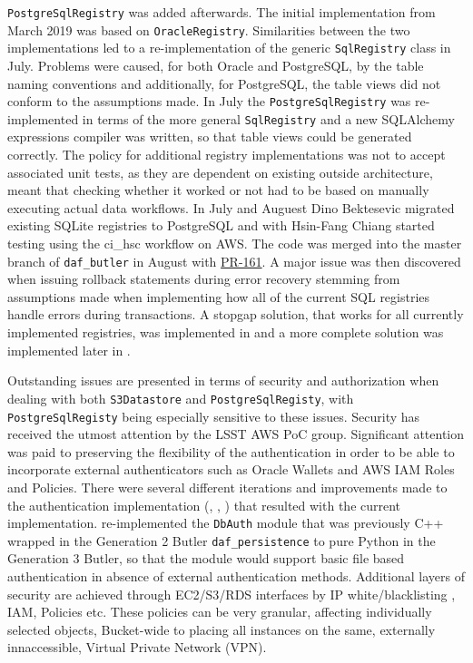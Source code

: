 \texttt{PostgreSqlRegistry} was added afterwards.
The initial implementation from March 2019 was based on \texttt{OracleRegistry}.
Similarities between the two implementations led to a re-implementation of the generic \texttt{SqlRegistry} class in July. Problems were caused, for both Oracle and PostgreSQL, by the table naming conventions and additionally, for PostgreSQL, the table views did not conform to the assumptions made. In July the \texttt{PostgreSqlRegistry} was re-implemented in terms of the more general \texttt{SqlRegistry} and a new SQLAlchemy expressions compiler was written, so that table views could be generated correctly. The policy for additional registry implementations was not to accept associated unit tests, as they are dependent on existing outside architecture, meant that checking whether it worked or not had to be based on manually executing actual data workflows.
In July and Auguest Dino Bektesevic migrated existing SQLite registries to PostgreSQL and with Hsin-Fang Chiang started testing using the ci\_hsc workflow on AWS. The code was merged into the master branch of \texttt{daf\_butler} in August with \href{https://github.com/lsst/daf_butler/pull/161}{PR-161}. A major issue was then discovered when issuing rollback statements during error recovery stemming from assumptions made when implementing how all of the current SQL registries handle errors during transactions. A stopgap solution, that works for all currently implemented registries, was implemented in  and a more complete solution was implemented later in .


Outstanding issues are presented in terms of security and authorization when dealing with both \texttt{S3Datastore} and \texttt{PostgreSqlRegisty}, with \texttt{PostgreSqlRegisty} being especially sensitive to these issues. Security has received the utmost attention by the LSST AWS PoC group. Significant attention was paid to preserving the flexibility of the authentication in order to be able to incorporate external authenticators such as Oracle Wallets and AWS IAM Roles and Policies. There were several different iterations and improvements made to the authentication implementation (, , ) that resulted with the current implementation.
 re-implemented the \texttt{DbAuth} module that was previously C++ wrapped in the Generation 2 Butler \texttt{daf\_persistence} to pure Python in the Generation 3 Butler, so that the module would support basic file based authentication in absence of external authentication methods. Additional layers of security are achieved through EC2/S3/RDS interfaces by IP white/blacklisting , IAM, Policies etc. These policies can be very granular, affecting individually selected objects, Bucket-wide to placing all instances on the same, externally innaccessible, Virtual Private Network (VPN).

